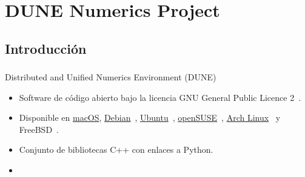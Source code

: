 






\section{DUNE Numerics Project}
\subsection{Introducción}

\begin{frame}
	\frametitle{\secname}
	\framesubtitle{\subsecname}

	\begin{alertblock}{Distributed and Unified Numerics Environment (DUNE)}
		\begin{itemize}
			\item

			      Software de código abierto bajo la licencia GNU General Public Licence 2~\gpllicense{}.

			\item

			      Disponible en
			      \href{https://github.com/dune-copasi/homebrew-tap}{macOS}, \href{https://packages.debian.org/search?suite=sid&section=all&arch=any&searchon=sourcenames&keywords=dune-}{Debian}~\debian{},
			      \href{https://launchpad.net/~opm/+archive/ubuntu/ppa}{Ubuntu}~\ubuntu{},
			      \href{https://build.opensuse.org/search?search_text=dune-&search_for=2&name=1&attrib_type_id=}{openSUSE}~\opensuse{},
			      \href{https://aur.archlinux.org/packages/?O=0&SeB=n&K=dune-&outdated=&SB=n&SO=a&PP=50&do_Search=Ir}{Arch Linux}~\archlinux{} y FreeBSD~\freebsd{}.


			\item

			      Conjunto de bibliotecas C++ con enlaces a Python.

			\item


\end{itemize}
\end{alertblock}
\end{frame}
